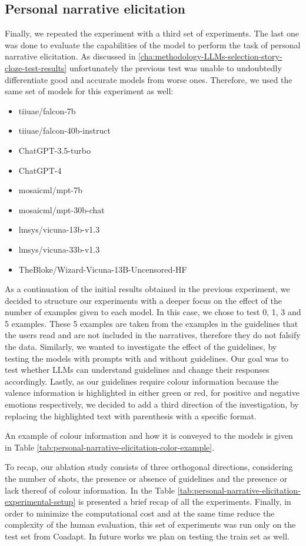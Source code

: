 \subsection{Personal narrative elicitation}
\label{cha:methodology-personal-narrative-elicitation}
Finally, we repeated the experiment with a third set of experiments. The last one was done to evaluate the capabilities of the model to perform the task of personal narrative elicitation.
As discussed in \ref{cha:methodology-LLMs-selection-story-cloze-test-results} unfortunately the previous test was unable to undoubtedly differentiate good and accurate models from worse ones. Therefore, we used the same set of models for this experiment as well:
\begin{itemize}
    \item   tiiuae/falcon-7b
    \item   tiiuae/falcon-40b-instruct
    \item   ChatGPT-3.5-turbo
    \item   ChatGPT-4
    \item   mosaicml/mpt-7b
    \item   mosaicml/mpt-30b-chat
    \item   lmsys/vicuna-13b-v1.3
    \item   lmsys/vicuna-33b-v1.3
    \item   TheBloke/Wizard-Vicuna-13B-Uncensored-HF
\end{itemize}
As a continuation of the initial results obtained in the previous experiment, we decided to structure our experiments with a deeper focus on the effect of the number of examples given to each model. In this case, we chose to test 0, 1, 3 and 5 examples. These 5 examples are taken from the examples in the guidelines that the users read and are not included in the narratives, therefore they do not falsify the data. Similarly, we wanted to investigate the effect of the guidelines, by testing the models with prompts with and without guidelines. Our goal was to test whether LLMs can understand guidelines and change their responses accordingly. Lastly, as our guidelines require colour information because the valence information is highlighted in either green or red, for positive and negative emotions respectively, we decided to add a third direction of the investigation, by replacing the highlighted text with parenthesis with a specific format.

An example of colour information and how it is conveyed to the models is given in Table \ref{tab:personal-narrative-elicitation-color-example}. 

To recap, our ablation study consists of three orthogonal directions, considering the number of shots, the presence or absence of guidelines and the presence or lack thereof of colour information. In the Table \ref{tab:personal-narrative-elicitation-experimental-setup} is presented a brief recap of all the experiments. 
Finally, in order to minimize the computational cost and at the same time reduce the complexity of the human evaluation, this set of experiments was run only on the test set from Coadapt. In future works we plan on testing the train set as well.
